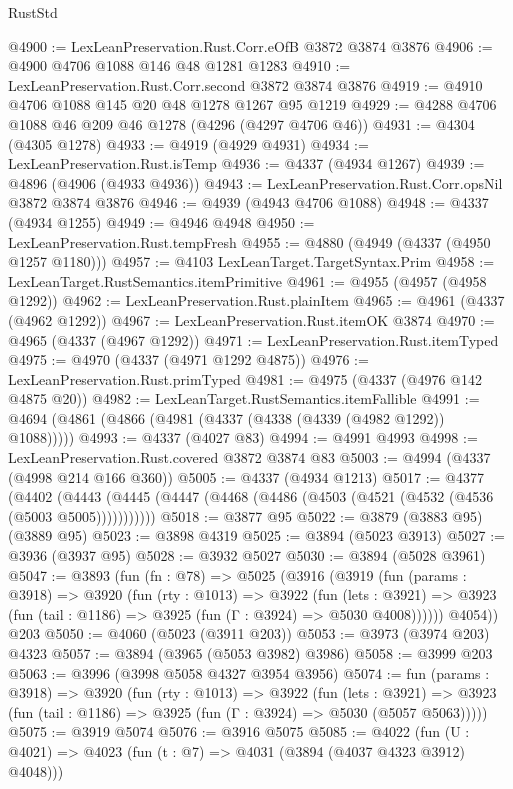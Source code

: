 \begin{lexlean}{RustStd}
\begin{coremodule}
@4900 := LexLeanPreservation.Rust.Corr.eOfB @3872 @3874 @3876
@4906 := @4900 @4706 @1088 @146 @48 @1281 @1283
@4910 := LexLeanPreservation.Rust.Corr.second @3872 @3874 @3876
@4919 := @4910 @4706 @1088 @145 @20 @48 @1278 @1267 @95 @1219
@4929 := @4288 @4706 @1088 @46 @209 @46 @1278 (@4296 (@4297 @4706 @46))
@4931 := @4304 (@4305 @1278)
@4933 := @4919 (@4929 @4931)
@4934 := LexLeanPreservation.Rust.isTemp
@4936 := @4337 (@4934 @1267)
@4939 := @4896 (@4906 (@4933 @4936))
@4943 := LexLeanPreservation.Rust.Corr.opsNil @3872 @3874 @3876
@4946 := @4939 (@4943 @4706 @1088)
@4948 := @4337 (@4934 @1255)
@4949 := @4946 @4948
@4950 := LexLeanPreservation.Rust.tempFresh
@4955 := @4880 (@4949 (@4337 (@4950 @1257 @1180)))
@4957 := @4103 LexLeanTarget.TargetSyntax.Prim
@4958 := LexLeanTarget.RustSemantics.itemPrimitive
@4961 := @4955 (@4957 (@4958 @1292))
@4962 := LexLeanPreservation.Rust.plainItem
@4965 := @4961 (@4337 (@4962 @1292))
@4967 := LexLeanPreservation.Rust.itemOK @3874
@4970 := @4965 (@4337 (@4967 @1292))
@4971 := LexLeanPreservation.Rust.itemTyped
@4975 := @4970 (@4337 (@4971 @1292 @4875))
@4976 := LexLeanPreservation.Rust.primTyped
@4981 := @4975 (@4337 (@4976 @142 @4875 @20))
@4982 := LexLeanTarget.RustSemantics.itemFallible
@4991 := @4694 (@4861 (@4866 (@4981 (@4337 (@4338 (@4339 (@4982 @1292)) @1088)))))
@4993 := @4337 (@4027 @83)
@4994 := @4991 @4993
@4998 := LexLeanPreservation.Rust.covered @3872 @3874 @83
@5003 := @4994 (@4337 (@4998 @214 @166 @360))
@5005 := @4337 (@4934 @1213)
@5017 := @4377
    (@4402 (@4443 (@4445 (@4447 (@4468 (@4486 (@4503 (@4521 (@4532 (@4536 (@5003 @5005)))))))))))
@5018 := @3877 @95
@5022 := @3879 (@3883 @95) (@3889 @95)
@5023 := @3898 @4319
@5025 := @3894 (@5023 @3913)
@5027 := @3936 (@3937 @95)
@5028 := @3932 @5027
@5030 := @3894 (@5028 @3961)
@5047 := @3893
    (fun (fn : @78) =>
    @5025
      (@3916
        (@3919
          (fun (params : @3918) =>
          @3920
            (fun (rty : @1013) =>
            @3922
              (fun (lets : @3921) =>
              @3923 (fun (tail : @1186) => @3925 (fun (Γ : @3924) => @5030 @4008))))))
        @4054))
    @203
@5050 := @4060 (@5023 (@3911 @203))
@5053 := @3973 (@3974 @203) @4323
@5057 := @3894 (@3965 (@5053 @3982) @3986)
@5058 := @3999 @203
@5063 := @3996 (@3998 @5058 @4327 @3954 @3956)
@5074 := fun (params : @3918) =>
  @3920
    (fun (rty : @1013) =>
    @3922
      (fun (lets : @3921) =>
      @3923 (fun (tail : @1186) => @3925 (fun (Γ : @3924) => @5030 (@5057 @5063)))))
@5075 := @3919 @5074
@5076 := @3916 @5075
@5085 := @4022 (fun (U : @4021) => @4023 (fun (t : @7) => @4031 (@3894 (@4037 @4323 @3912) @4048)))

\end{coremodule}
\end{lexlean}
